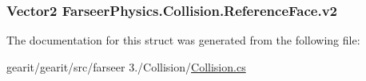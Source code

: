 \hypertarget{struct_farseer_physics_1_1_collision_1_1_reference_face_aee96716c7114f0e2166ca2c9fb07607a}{
\subsubsection[{v2}]{\setlength{\rightskip}{0pt plus 5cm}Vector2 Farseer\+Physics.\+Collision.\+Reference\+Face.\+v2}}\label{struct_farseer_physics_1_1_collision_1_1_reference_face_aee96716c7114f0e2166ca2c9fb07607a}


The documentation for this struct was generated from the following file\+:\begin{DoxyCompactItemize}
\item 
gearit/gearit/src/farseer 3./\+Collision/\hyperlink{_collision_8cs}{Collision.\+cs}\end{DoxyCompactItemize}
